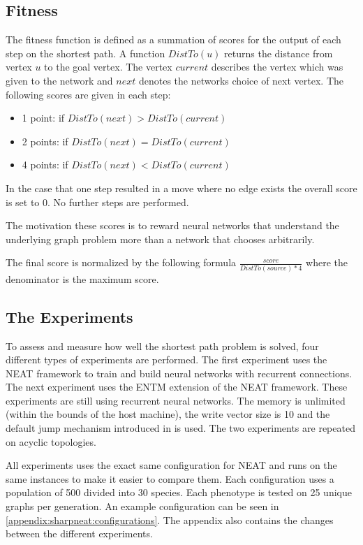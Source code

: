 \subsection{Fitness}
The fitness function is defined as a summation of scores for the output of each step on the shortest path. A function $ DistTo(u) $ returns the distance from vertex $ u $ to the goal vertex. The vertex $ current $ describes the vertex which was given to the network and $ next $ denotes the networks choice of next vertex. The following scores are given in each step:

\begin{itemize}
	\item[] 1 point: if $ DistTo(next) > DistTo(current) $
	\item[] 2 points: if $ DistTo(next) = DistTo(current) $
	\item[] 4 points: if $ DistTo(next) < DistTo(current) $
\end{itemize}

\noindent In the case that one step resulted in a move where no edge exists the overall score is set to 0. No further steps are performed.

\newpar The motivation these scores is to reward neural networks that understand the underlying graph problem more than a network that chooses arbitrarily.

\newpar The final score is normalized by the following formula $ \frac{score}{DistTo(source)*4} $ where the denominator is the  maximum score.

\subsection{The Experiments}
To assess and measure how well the shortest path problem is solved, four different types of experiments are performed. The first experiment uses the NEAT framework to train and build neural networks with recurrent connections. The next experiment uses the ENTM extension of the NEAT framework. These experiments are still using recurrent neural networks. The memory is unlimited (within the bounds of the host machine), the write vector size is 10 and the default jump mechanism introduced in \cite{luders2017continual} is used. The two experiments are repeated on acyclic topologies.

\newpar All experiments uses the exact same configuration for NEAT and runs on the same instances to make it easier to compare them. Each configuration uses a population of 500 divided into 30 species. Each phenotype is tested on 25 unique graphs per generation. An example configuration can be seen in \autoref{appendix:sharpneat:configurations}. The appendix also contains the changes between the different experiments.